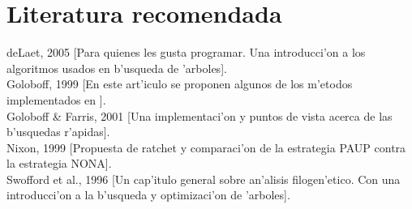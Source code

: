 \section{Literatura recomendada}
\noindent
deLaet, 2005 [Para quienes les gusta programar. Una introducci'on a los algoritmos usados en b'usqueda de 'arboles].\\
Goloboff, 1999 [En este art'iculo se proponen algunos de los m'etodos implementados en ].\\
Goloboff \& Farris, 2001 [Una implementaci'on y puntos de vista acerca de las b'usquedas r'apidas].\\
Nixon, 1999 [Propuesta de ratchet y comparaci'on de la estrategia PAUP contra la estrategia NONA].\\
Swofford et al., 1996 [Un cap'itulo general sobre an'alisis filogen'etico. Con una introducci'on a la b'usqueda y optimizaci'on de 'arboles].